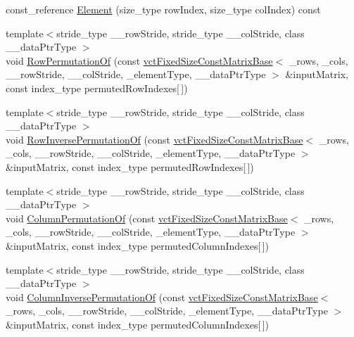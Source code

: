 \begin{DoxyCompactItemize}
\item 
const\-\_\-reference \hyperlink{classvct_fixed_size_matrix_base_aad8ff7a5c3253f691872fdeed019cde9}{Element} (size\-\_\-type row\-Index, size\-\_\-type col\-Index) const 
\item 
{\footnotesize template$<$stride\-\_\-type \-\_\-\-\_\-row\-Stride, stride\-\_\-type \-\_\-\-\_\-col\-Stride, class \-\_\-\-\_\-data\-Ptr\-Type $>$ }\\void \hyperlink{classvct_fixed_size_matrix_base_a2137b6301386c1d6215016fa70fd5803}{Row\-Permutation\-Of} (const \hyperlink{classvct_fixed_size_const_matrix_base}{vct\-Fixed\-Size\-Const\-Matrix\-Base}$<$ \-\_\-rows, \-\_\-cols, \-\_\-\-\_\-row\-Stride, \-\_\-\-\_\-col\-Stride, \-\_\-element\-Type, \-\_\-\-\_\-data\-Ptr\-Type $>$ \&input\-Matrix, const index\-\_\-type permuted\-Row\-Indexes\mbox{[}$\,$\mbox{]})
\item 
{\footnotesize template$<$stride\-\_\-type \-\_\-\-\_\-row\-Stride, stride\-\_\-type \-\_\-\-\_\-col\-Stride, class \-\_\-\-\_\-data\-Ptr\-Type $>$ }\\void \hyperlink{classvct_fixed_size_matrix_base_ab41253c2d33ceaa891c78a6d94056b67}{Row\-Inverse\-Permutation\-Of} (const \hyperlink{classvct_fixed_size_const_matrix_base}{vct\-Fixed\-Size\-Const\-Matrix\-Base}$<$ \-\_\-rows, \-\_\-cols, \-\_\-\-\_\-row\-Stride, \-\_\-\-\_\-col\-Stride, \-\_\-element\-Type, \-\_\-\-\_\-data\-Ptr\-Type $>$ \&input\-Matrix, const index\-\_\-type permuted\-Row\-Indexes\mbox{[}$\,$\mbox{]})
\item 
{\footnotesize template$<$stride\-\_\-type \-\_\-\-\_\-row\-Stride, stride\-\_\-type \-\_\-\-\_\-col\-Stride, class \-\_\-\-\_\-data\-Ptr\-Type $>$ }\\void \hyperlink{classvct_fixed_size_matrix_base_aa73932f32c0bf1b44136615a6f1be4dc}{Column\-Permutation\-Of} (const \hyperlink{classvct_fixed_size_const_matrix_base}{vct\-Fixed\-Size\-Const\-Matrix\-Base}$<$ \-\_\-rows, \-\_\-cols, \-\_\-\-\_\-row\-Stride, \-\_\-\-\_\-col\-Stride, \-\_\-element\-Type, \-\_\-\-\_\-data\-Ptr\-Type $>$ \&input\-Matrix, const index\-\_\-type permuted\-Column\-Indexes\mbox{[}$\,$\mbox{]})
\item 
{\footnotesize template$<$stride\-\_\-type \-\_\-\-\_\-row\-Stride, stride\-\_\-type \-\_\-\-\_\-col\-Stride, class \-\_\-\-\_\-data\-Ptr\-Type $>$ }\\void \hyperlink{classvct_fixed_size_matrix_base_a7cc425e8426d9b6e05e73879b0eeb7fc}{Column\-Inverse\-Permutation\-Of} (const \hyperlink{classvct_fixed_size_const_matrix_base}{vct\-Fixed\-Size\-Const\-Matrix\-Base}$<$ \-\_\-rows, \-\_\-cols, \-\_\-\-\_\-row\-Stride, \-\_\-\-\_\-col\-Stride, \-\_\-element\-Type, \-\_\-\-\_\-data\-Ptr\-Type $>$ \&input\-Matrix, const index\-\_\-type permuted\-Column\-Indexes\mbox{[}$\,$\mbox{]})

\end{DoxyCompactItemize}
